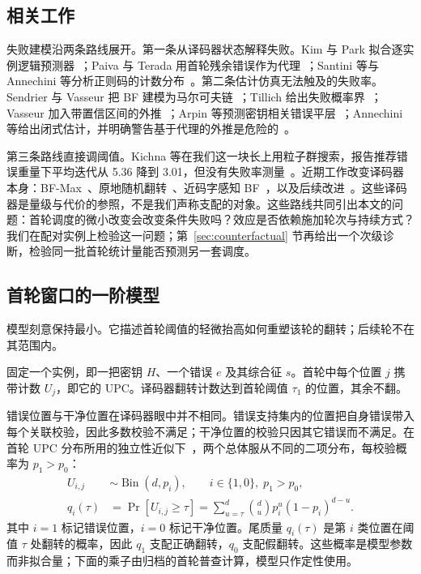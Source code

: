 \documentclass[UTF8,a4paper,10pt,twocolumn]{ctexart}
\begin{document}
\subsection{相关工作}

失败建模沿两条路线展开。第一条从译码器状态解释失败。Kim 与 Park 拟合逐实例逻辑预测器~\cite{kim2021logistic}；Paiva 与 Terada 用首轮残余错误作为代理~\cite{paiva2022pickyfix}；Santini 等与 Annechini 等分析正则码的计数分布~\cite{santini2019conservative,annechini2024estimation}。第二条估计仿真无法触及的失败率。Sendrier 与 Vasseur 把 BF 建模为马尔可夫链~\cite{sendrier2019dfr,sendrier2020lowdfr}；Tillich 给出失败概率界~\cite{tillich2018dfp}；Vasseur 加入带置信区间的外推~\cite{vasseur2021thesis}；Arpin 等预测密钥相关错误平层~\cite{arpin2025errorfloor}；Annechini 等给出闭式估计，并明确警告基于代理的外推是危险的~\cite{annechini2025closedform}。

第三条路线直接调阈值。Kichna 等在我们这一块长上用粒子群搜索，报告推荐错误重量下平均迭代从 5.36 降到 3.01，但没有失败率测量~\cite{kichna2025pso}。近期工作改变译码器本身：BF-Max~\cite{baldelli2025bfmax}、原地随机翻转~\cite{baldi2021inplace}、近码字感知 BF~\cite{baldelli2026ncw}，以及后续改进~\cite{santini2026flip}。这些译码器是量级与代价的参照，不是我们声称支配的对象。这些路线共同引出本文的问题：首轮调度的微小改变会改变条件失败吗？效应是否依赖施加轮次与持续方式？我们在配对实例上检验这一问题；第~\ref{sec:counterfactual} 节再给出一个次级诊断，检验同一批首轮统计量能否预测另一套调度。
\subsection{首轮窗口的一阶模型}\label{sec:model}

模型刻意保持最小。它描述首轮阈值的轻微抬高如何重塑该轮的翻转；后续轮不在其范围内。

固定一个实例，即一把密钥 $H$、一个错误 $e$ 及其综合征 $s$。首轮中每个位置 $j$ 携带计数 $U_j$，即它的 UPC。译码器翻转计数达到首轮阈值 $\tau_1$ 的位置，其余不翻。

错误位置与干净位置在译码器眼中并不相同。错误支持集内的位置把自身错误带入每个关联校验，因此多数校验不满足；干净位置的校验只因其它错误而不满足。在首轮 UPC 分布所用的独立性近似下~\cite{annechini2024estimation}，两个总体服从不同的二项分布，每校验概率为 $p_1>p_0$：
\begin{equation}\label{eq:upc-tails}
\begin{aligned}
U_{i,j} &\sim \operatorname{Bin}(d,p_i), \qquad i\in\{1,0\},\; p_1>p_0,\\
q_i(\tau) &= \Pr[U_{i,j}\ge\tau]
= \textstyle\sum_{u=\tau}^{d}\binom{d}{u}p_i^{u}(1-p_i)^{d-u}.
\end{aligned}
\end{equation}
其中 $i=1$ 标记错误位置，$i=0$ 标记干净位置。尾质量 $q_i(\tau)$ 是第 $i$ 类位置在阈值 $\tau$ 处翻转的概率，因此 $q_1$ 支配正确翻转，$q_0$ 支配假翻转。这些概率是模型参数而非拟合量；下面的乘子由归档的首轮普查计算，模型只作定性使用。
\end{document}
